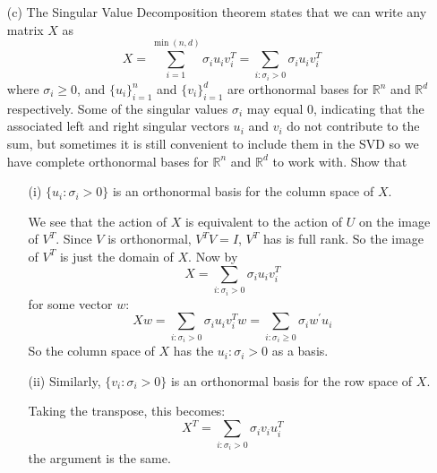 \documentclass{article}
\begin{document}
\begin{itemize}
        \item [(c)] The Singular Value Decomposition theorem states that we can write any matrix $X$ as 
            \begin{equation*}
                X = \sum_{i = 1}^{\min(n, d)}\sigma_{i} u_{i} v_{i}^{T} = \sum_{i: \sigma_{i} > 0}\sigma_{i} u_{i} v_{i}^{T}
            \end{equation*}
        where $\sigma_{i} \geq 0$, and $\{u_{i}\}^{n}_{i = 1}$ and $\{v_{i}\}_{i = 1}^{d}$ are orthonormal bases for $\mathbb{R}^{n}$ and $\mathbb{R}^{d}$ respectively. Some of the singular values $\sigma_{i}$ may equal $0$, indicating that the associated left and right singular vectors $u_{i}$ and $v_{i}$ do not contribute to the sum, but sometimes it is still convenient to include them in the SVD so we have complete orthonormal bases for $\mathbb{R}^{n}$ and $\mathbb{R}^{d}$ to work with. Show that
            \begin{itemize}
                \item [(i)] $\{u_{i} : \sigma_{i} > 0\}$ is an orthonormal basis for the column space of $X$.
                    \begin{answer}
                        We see that the action of $X$ is equivalent to the action of $U$ on the image of $V^{T}$. Since $V$ is orthonormal, $V^{T}V = I$, $V^{T}$ has is full rank. So the image of $V^{T}$ is just the domain of $X$. Now by
                            \begin{equation*}
                                X = \sum_{i : \sigma_{i} > 0}\sigma_{i}u_{i}v_{i}^{T}
                            \end{equation*}
                        for some vector $w$:
                            \begin{equation*}
                                Xw = \sum_{i: \sigma_{i} > 0} \sigma_{i}u_{i}v_{i}^{T}w = \sum_{i : \sigma_{i} \geq 0} \sigma_{i} w^{\prime} u_{i}
                            \end{equation*}
                        So the column space of $X$ has the $u_{i} : \sigma_{i} > 0$ as a basis.
                    \end{answer}

                \item [(ii)] Similarly, $\{v_{i} : \sigma_{i} > 0\}$ is an orthonormal basis for the row space of $X$.
                    \begin{answer}
                        Taking the transpose, this becomes:
                            \begin{equation*}
                                X^{T} = \sum_{i : \sigma_{i}  > 0} \sigma_{i}v_{i}u_{i}^{T}
                            \end{equation*}
                        the argument is the same.
                    \end{answer}
            \end{itemize}


\end{itemize}
\end{document}
